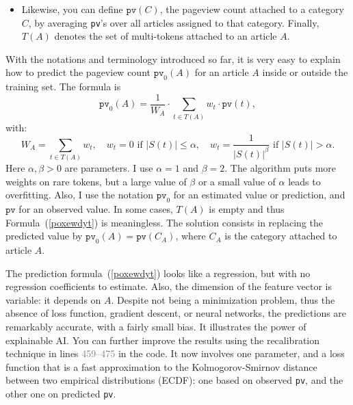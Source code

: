 \documentclass[oneside,10pt]{book}
\begin{document}
\begin{itemize}
\item Likewise, you can define $\texttt{pv}(C)$, the pageview count attached to a category $C$, by averaging \texttt{pv}'s over all articles assigned to that category. 
Finally, $T(A)$ denotes the set of multi-tokens attached to an article $A$. 
\end{itemize}
\vspace{1ex}

\noindent With the notations and terminology introduced so far, it is very easy to explain how to predict the pageview count 
$\texttt{pv}_0(A)$ for an article $A$ inside or outside the training set. The formula is
\begin{equation}
\texttt{pv}_0(A) =  \frac{1}{W_A}\cdot \sum_{t\in T(A)} w_t \cdot \texttt{pv}(t), \label{poxewdyt}
\end{equation}
with:
$$
W_A  = \sum_{t\in T(A)} w_t, \quad
w_t  = 0 \text{ if } |S(t)| \leq \alpha, \quad
w_t  = \frac{1}{|S(t)|^\beta} \text{ if } |S(t)| > \alpha.  
$$
Here $\alpha, \beta > 0$ are parameters. I use $\alpha = 1$ and $\beta = 2$.  The algorithm puts more weights on rare tokens, but a large value of
 $\beta$ or a small value of $\alpha$ leads to \textcolor{index}{overfitting}. Also, I use the notation
 $\texttt{pv}_0$ for an estimated value or prediction, and $\texttt{pv}$ for an observed value.  In some cases, $T(A)$ is empty and thus
 Formula~(\ref{poxewdyt}) is meaningless. The solution consists in replacing the predicted value by $\texttt{pv}_0(A) = \texttt{pv}(C_A)$, where
 $C_A$ is the category attached to article $A$. 

The prediction formula~(\ref{poxewdyt})  looks like a regression, but with no regression coefficients to estimate. Also, the dimension of 
 the feature vector is variable: it depends on $A$. Despite not being a  minimization problem, thus the absence of loss function, gradient descent, or neural networks, the predictions are remarkably accurate, with a fairly small bias. It illustrates the power of \textcolor{index}{explainable AI}. You can further improve
 the results using the recalibration technique in lines \textcolor{gray}{459--475} in the code. It now involves one parameter, and a \textcolor{index}{loss function} that is a fast
 approximation to  the \textcolor{index}{Kolmogorov-Smirnov distance} between 
two \textcolor{index}{empirical distributions} (ECDF): one based on observed \texttt{pv}, and the other one on predicted \texttt{pv}. 
\end{document}
